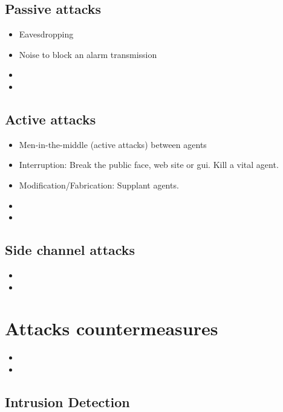 \documentclass[10pt,a4paper,twoside]{llncs}
\begin{document}
%
\subsection{Passive attacks \label{sec:passiveAttacks}}

\begin{itemize}
 \item Eavesdropping
 \item Noise to block an alarm transmission
 \item 
 \item 
\end{itemize}

%
\subsection{Active attacks \label{sec:activeAttacks}}

\begin{itemize}
 \item Men-in-the-middle (active attacks) between agents
 \item Interruption: Break the public face, web site or gui. Kill a vital agent.
 \item Modification/Fabrication: Supplant agents.
 \item 
 \item 
\end{itemize}

%
\subsection{Side channel attacks \label{sec:sideChannelAttacks}}

\begin{itemize}
 \item
 \item 
\end{itemize}

%
\section{Attacks countermeasures \label{sec:countermeasures}}

\begin{itemize}
 \item
 \item 
\end{itemize}

%
\subsection{Intrusion Detection \label{sec:intrusionDetection}}
\end{document}
